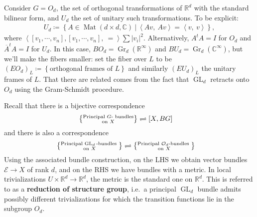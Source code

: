 \begin{example}[?]

Consider \(G = O_d\), the set of orthogonal transformations of
\({\mathbb{R}}^d\) with the standard bilinear form, and \(U_d\) the set
of unitary such transformations. To be explicit:
\begin{align*}
U_d \coloneqq\left\{{ A \in \operatorname{Mat}(d \times d, {\mathbb{C}}) {~\mathrel{\Big|}~}{\left\langle {Av},~{Av} \right\rangle} = {\left\langle {v},~{v} \right\rangle} }\right\}
,\end{align*}
where
\({\left\langle { {\left[ {v_1, \cdots, v_n} \right]}, {\left[ {v_1, \cdots, v_n } \right]} },~{=} \right\rangle} \sum {\left\lvert {v_i} \right\rvert}^2\).
Alternatively, \(A^t A = I\) for \(O_d\) and
\({\overline{{A}}}^t A = I\) for \(U_d\). In this case,
\(BO_d = {\operatorname{Gr}}_d( {\mathbb{R}}^{\infty } )\) and
\(BU_d = {\operatorname{Gr}}_d( {\mathbb{C}}^{ \infty })\), but we'll
make the fibers smaller: set the fiber over \(L\) to be
\((EO_d)_L \coloneqq\left\{{ \text{orthogonal frames of } L }\right\}\)
and similarly \((EU_d)_L\) the unitary frames of \(L\). That there are
related comes from the fact that \(\operatorname{GL}_d\) retracts onto
\(O_d\) using the Gram-Schmidt procedure.

\end{example}

\begin{remark}

Recall that there is a bijective correspondence
\begin{align*}
\left\{{\substack{
  \text{Principal $G{\hbox{-}}$ bundles}
  \\ \text{on } X
}}\right\}
&\rightleftharpoons
  [X, BG]
\end{align*}
and there is also a correspondence
\begin{align*}
\left\{{\substack{
  \text{Principal $\operatorname{GL}_d{\hbox{-}}$bundles }\\
  \text{on } X
}}\right\}
&\rightleftharpoons
\left\{{\substack{
  \text{Principal ${\mathcal{O}}_d{\hbox{-}}$bundles } \\
  \text{on } X
}}\right\}
\end{align*}
Using the associated bundle construction, on the LHS we obtain vector
bundles \(\mathcal{E}\to X\) of rank \(d\), and on the RHS we have
bundles with a metric. In local trivializations
\(U \times{\mathbb{R}}^d \to {\mathbb{R}}^d\), the metric is the
standard one on \({\mathbb{R}}^d\). This is referred to as a
\textbf{reduction of structure group}, i.e.~a principal
\(\operatorname{GL}_d\) bundle admits possibly different trivializations
for which the transition functions lie in the subgroup \(O_d\).

\end{remark}

